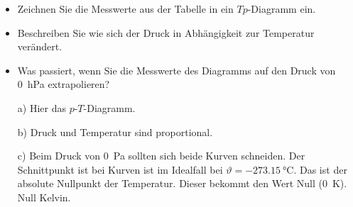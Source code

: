 \documentclass[12pt,a4paper,twoside]{article}
\begin{document}
\begin{aufgabe}
\begin{itemize}
\item Zeichnen Sie die Messwerte aus der Tabelle in ein $Tp$-Diagramm ein.
\item Beschreiben Sie wie sich der Druck in Abhängigkeit zur Temperatur verändert.
\item Was passiert, wenn Sie die Messwerte des Diagramms auf den Druck von \SI{0}{hPa} extrapolieren?
\end{itemize}
\begin{loesung}
	\begin{itemize}
		\item [a)] Hier das $p$-$T$-Diagramm.\par
	
\item [b)] Druck und Temperatur sind proportional.
\item [c)] Beim Druck von \SI{0}{Pa} sollten sich beide Kurven schneiden. Der Schnittpunkt ist bei Kurven ist im 
	Idealfall bei $\vartheta=\SI{-273.15}{\celsius}$. Das ist der absolute Nullpunkt der Temperatur. Dieser bekommt den Wert Null (\SI{0}{K}).
	Null Kelvin.
	\end{itemize}
\end{loesung}
\end{aufgabe}


%
\end{document}

